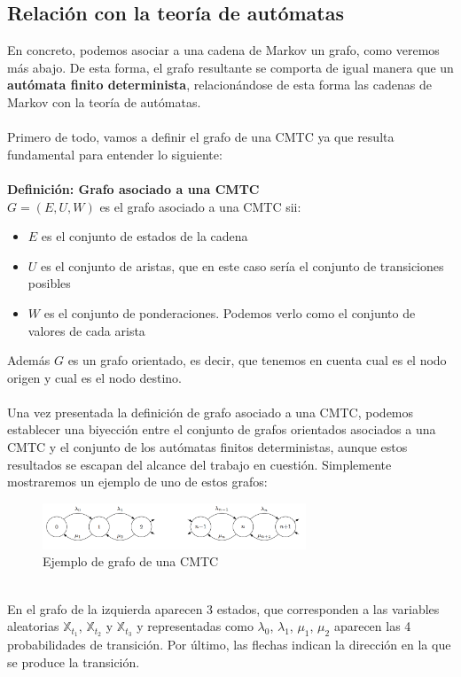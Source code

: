 \documentclass[12pt,a4paper]{article}
\begin{document}
\subsection{Relación con la teoría de autómatas}
En concreto, podemos asociar a una cadena de Markov un grafo, como veremos más abajo. De esta forma, el grafo resultante se comporta de igual manera que un \textbf{autómata finito determinista}, relacionándose de esta forma las cadenas de Markov con la teoría de autómatas.
\\\\
Primero de todo, vamos a definir el grafo de una CMTC ya que resulta fundamental para entender lo siguiente:
\\\\
\textbf{Definición: Grafo asociado a una CMTC}
\\
$G=(E,U,W)$ es el grafo asociado a una CMTC sii:
\begin{itemize}
\item $E$ es el conjunto de estados de la cadena
\item $U$ es el conjunto de aristas, que en este caso sería el conjunto de transiciones posibles
\item $W$ es el conjunto de ponderaciones. Podemos verlo como el conjunto de valores de cada arista
\end{itemize}
Además $G$ es un grafo orientado, es decir, que tenemos en cuenta cual es el nodo origen y cual es el nodo destino.
\\\\
Una vez presentada la definición de grafo asociado a una CMTC, podemos establecer una biyección entre el conjunto de grafos orientados asociados a una CMTC y el conjunto de los autómatas finitos deterministas, aunque estos resultados se escapan del alcance del trabajo en cuestión. Simplemente mostraremos un ejemplo de uno de estos grafos:
\\
\begin{figure}[h]
  \centering
    \includegraphics[width=0.7\textwidth]{img/grafo.png}
  \caption{Ejemplo de grafo de una CMTC}
  \label{fig:ejemplo}
\end{figure}
\\
En el grafo de la izquierda aparecen 3 estados, que corresponden a las variables aleatorias $\mathbb{X}_{t_1}$, $\mathbb{X}_{t_2}$ y $\mathbb{X}_{t_3}$ y representadas como $\lambda_0$, $\lambda_1$, $\mu_1$, $\mu_2$ aparecen las 4 probabilidades de transición. Por último, las flechas indican la dirección en la que se produce la transición.
\end{document}
